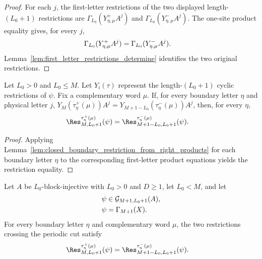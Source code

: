 \begin{proof}
    \leanok
    For each $j$, the first-letter restrictions of the two displayed
    length-$(L_0+1)$ restrictions are
    $\Gamma_{L_0}(Y^+_{\eta,\mu}A^j)$ and
    $\Gamma_{L_0}(Y^-_{\eta,\mu}A^j)$. The one-site product equality gives,
    for every $j$,
    \begin{align}
        \Gamma_{L_0}(Y^+_{\eta,\mu}A^j)
         & = \Gamma_{L_0}(Y^-_{\eta,\mu}A^j).
        \notag
    \end{align}
    Lemma~\ref{lem:first_letter_restrictions_determine} identifies the two
    original restrictions.
\end{proof}

\begin{lemma}
    \label{lem:closed_boundary_restrictions_from_first_letter_products}
    \leanok
    Let $L_0>0$ and $L_0\le M$. Let $Y_i(\tau)$ represent the
    length-$(L_0+1)$ cyclic restrictions of $\psi$. Fix a complementary
    word $\mu$. If, for every boundary letter $\eta$ and physical letter
    $j$,
    $Y_M(\tau^+_\eta(\mu))A^j = Y_{M+1-L_0}(\tau^-_\eta(\mu))A^j$,
    then, for every $\eta$,
    \begin{align}
        \Res^{\tau^+_\eta(\mu)}_{M,L_0+1}(\psi)
         & = \Res^{\tau^-_\eta(\mu)}_{M+1-L_0,L_0+1}(\psi).
        \notag
    \end{align}
\end{lemma}

\begin{proof}
    \leanok
    Applying Lemma~\ref{lem:closed_boundary_restriction_from_right_products} for
    each boundary letter $\eta$ to the corresponding first-letter product
    equations yields the restriction equality.
\end{proof}

\begin{lemma}
    \label{lem:closure_property_boundary_restriction_chain_ground_space}
    \leanok
    Let $A$ be $L_0$-block-injective with $L_0>0$ and $D\ge1$, let
    $L_0<M$, and let
    \begin{align}
        \psi & \in\mathcal G_{M+1,L_0+1}(A),
        \notag                               \\
        \psi & = \Gamma_{M+1}(X).
        \notag
    \end{align}
    For every boundary letter $\eta$ and complementary word $\mu$, the two
    restrictions crossing the periodic cut satisfy
    \begin{align}
        \Res^{\tau^+_{\eta}(\mu)}_{M,L_0+1}(\psi)
         & = \Res^{\tau^-_{\eta}(\mu)}_{M+1-L_0,L_0+1}(\psi).
        \notag
    \end{align}
\end{lemma}

